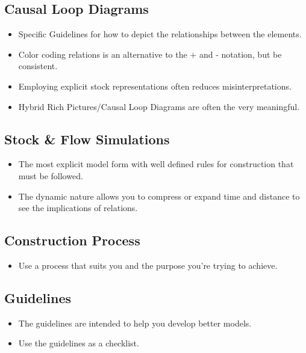 \documentclass[]{memoir}
\begin{document}
\subsection{Causal Loop Diagrams}

\begin{itemize}
\itemsep1pt\parskip0pt
\item
  Specific Guidelines for how to depict the relationships between the
  elements.
\item
  Color coding relations is an alternative to the + and - notation, but
  be consistent.
\item
  Employing explicit stock representations often reduces
  misinterpretations.
\item
  Hybrid Rich Pictures/Causal Loop Diagrams are often the very
  meaningful.
\end{itemize}

\subsection{Stock \& Flow Simulations}

\begin{itemize}
\itemsep1pt\parskip0pt
\item
  The most explicit model form with well defined rules for construction
  that must be followed.
\item
  The dynamic nature allows you to compress or expand time and distance
  to see the implications of relations.
\end{itemize}

\subsection{Construction Process}

\begin{itemize}
\itemsep1pt\parskip0pt
\item
  Use a process that suits you and the purpose you're trying to achieve.
\end{itemize}

\subsection{Guidelines}

\begin{itemize}
\itemsep1pt\parskip0pt
\item
  The guidelines are intended to help you develop better models.
\item
  Use the guidelines as a checklist.
\end{itemize}
\end{document}
